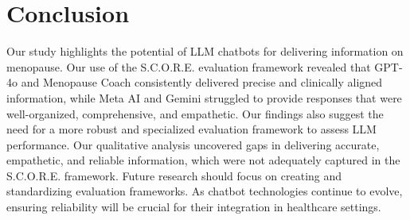 \documentclass{IOS-Book-Article}
\def\hb{\hbox to 11.5 cm{}}
\begin{document}
\markboth{April 2024\hb}{April 2024\hb}


\newcommand{\mieadd}[1]{\textcolor{red}{#1}}
\newcommand{\mierm}[1]{\st{#1}}







\section{Conclusion}
Our study highlights the potential of LLM chatbots for delivering information on menopause. Our use of the S.C.O.R.E. evaluation framework revealed that GPT-4o and Menopause Coach consistently delivered precise and clinically aligned information, while Meta AI and Gemini struggled to provide responses that were well-organized, comprehensive, and empathetic.
Our findings also suggest the need for a more robust and specialized evaluation framework to assess LLM performance. 
Our qualitative analysis uncovered gaps in delivering accurate, empathetic, and reliable information, which were not adequately captured in the S.C.O.R.E. framework.
Future research should focus on creating and standardizing evaluation frameworks. 
 As chatbot technologies continue to evolve, ensuring reliability will be crucial for their integration in healthcare settings.



\end{document}
